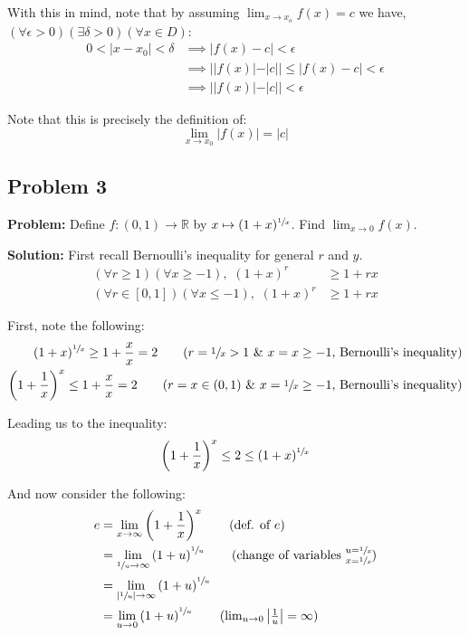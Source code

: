 \documentclass{article}
\newcommand{\R}{\mathbb R}
\begin{document}
With this in mind, note that by assuming $\lim_{x\to x_o}f(x)=c$ we have, $(\forall\epsilon>0)(\exists\delta>0)(\forall x\in D)$:
\begin{align*}
  0<|x-x_0|<\delta&\implies |f(x)-c|<\epsilon\tag{def. of limit}\\
  &\implies ||f(x)|-|c||\le|f(x)-c|<\epsilon\tag{reverse triangle inequality}\\
  &\implies ||f(x)|-|c||<\epsilon\tag{transitivity}
\end{align*}

Note that this is precisely the definition of:
$$\lim_{x\to x_0}|f(x)|=|c|$$

\subsection*{Problem 3}
\noindent\textbf{Problem:} Define $f:(0,1)\to\R$ by $x\mapsto(1+x)^{\sfrac{1}{x}}$. Find $\lim_{x\to0}f(x)$.
\bigskip

\noindent\textbf{Solution:} First recall Bernoulli's inequality for general $r$ and $y$.
\begin{align*}
  (\forall r\ge 1)(\forall x\ge -1),\,\,(1+x)^r&\ge 1+rx\\
  (\forall r\in[0,1])(\forall x\le -1),\,\,(1+x)^r&\ge 1+rx
\end{align*}

First, note the following:
\begin{align*}
  (1+x)^{\sfrac{1}{x}}\ge 1+\frac{x}{x}=2\tag{$r=\sfrac{1}{x}>1$ \& $x=x\ge -1$, Bernoulli's inequality}\\
  \left(1+\frac{1}{x}\right)^x\le 1+\frac{x}{x}=2\tag{$r=x\in(0,1)$ \& $x=\sfrac{1}{x}\ge -1$, Bernoulli's inequality}
\end{align*}

Leading us to the inequality:
\begin{equation*}
  \left(1+\frac{1}{x}\right)^x\le2\le(1+x)^{\sfrac{1}{x}}
\end{equation*}

And now consider the following:
\begin{align*}
  e&=\lim_{x\to\infty}\left(1+\frac{1}{x}\right)^x\tag{def. of $e$}\\
  &=\lim_{\sfrac{1}{u}\to\infty}\left(1+u\right)^{\sfrac{1}{u}}\tag{change of variables $\substack{u=\sfrac{1}{x}\\x=\sfrac{1}{x}}$}\\
  &=\lim_{\left|\sfrac{1}{u}\right|\to\infty}\left(1+u\right)^{\sfrac{1}{u}}\\
  &=\lim_{u\to0}\left(1+u\right)^{\sfrac{1}{u}}\tag{$\lim_{u\to0}\left|\frac{1}{u}\right|=\infty$}
\end{align*}
\end{document}
